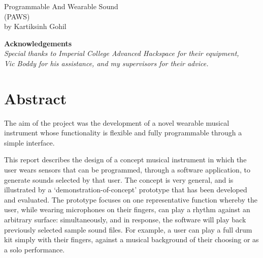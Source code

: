 \thispagestyle{empty}

\begin{tabular}{|l}

\end{tabular}


\vspace{150 pt}
\begin{center}
\huge Programmable And Wearable Sound\\
\LARGE  (PAWS)\\
\bigskip
\LARGE by Kartiksinh Gohil

\end{center}

\vspace{100 pt}
\begin{center}
\textbf{Acknowledgements}\\
\textit{Special thanks to Imperial College Advanced Hackspace for their equipment,\\Vic Boddy for his assistance, and my supervisors for their advice.}\\

\end{center}

\vfill
\normalsize
\section*{Abstract} \label{Project Specification}

The aim of the project was the development of a novel wearable musical instrument whose functionality is flexible and fully programmable through a simple interface.

This report describes the design of a concept musical instrument in which the user wears sensors that can be programmed, through a software application, to generate sounds selected by that user. The concept is very general, and is illustrated by a `demonstration-of-concept' prototype that has been developed and evaluated.  The prototype focuses on one representative function whereby the user, while wearing microphones on their fingers, can play a rhythm against an arbitrary surface: simultaneously, and in response, the software will play back previously selected sample sound files. For example, a user can play a full drum kit simply with their fingers, against a musical background of their choosing or as a solo performance.

